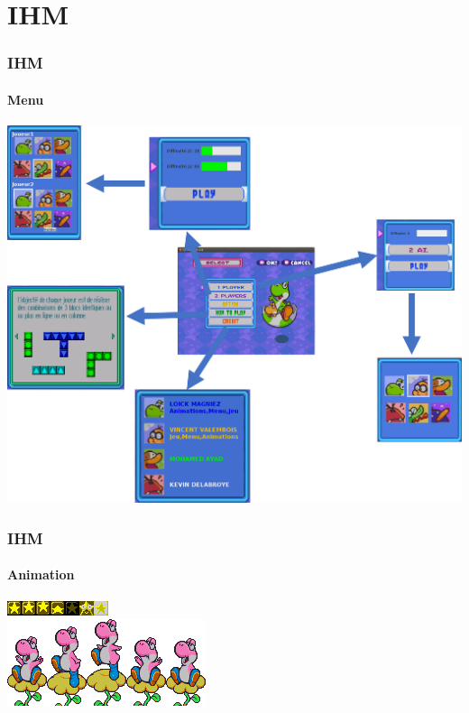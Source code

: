 \documentclass{beamer}
\begin{document}
\begin{darkframes}
\begin{frame}
\begin{center}
		\end{center}
    \end{frame}
  
   \section{IHM}
 \begin{frame}
 	 \frametitle{IHM}
 	 \begin{center}
 	 \framesubtitle{Menu}
		\includegraphics[scale=0.30]{./Image/arbo.png}
		\end{center}
    \end{frame}
    
         \begin{frame}
 	 \frametitle{IHM}
 	 \begin{center}
 	 \framesubtitle{Animation}
		\includegraphics[scale=1.5]{./Image/jaune.png}\\%
		\includegraphics[scale=1.0]{./Image/spriteSheet.png}
		\end{center}
    \end{frame}
    

\end{darkframes}
\end{document}
